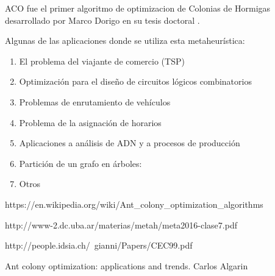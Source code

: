 ACO fue el primer algoritmo de optimizacion de Colonias de Hormigas desarrollado por Marco Dorigo en su tesis doctoral \cite{paperDorigo}. 

Algunas de las aplicaciones donde se utiliza esta metaheurística:
\begin{enumerate}
\item El problema del viajante de comercio (TSP)
\item Optimización para el diseño de circuitos lógicos combinatorios
\item Problemas de enrutamiento de vehículos
\item Problema de la asignación de horarios
\item Aplicaciones a análisis de ADN y a procesos de producción
\item Partición de un grafo en árboles:
\item Otros
\end{enumerate}



\begin{thebibliography}{9}
https://en.wikipedia.org/wiki/Ant\_colony\_optimization\_algorithms

http://www-2.dc.uba.ar/materias/metah/meta2016-clase7.pdf

 
http://people.idsia.ch/~gianni/Papers/CEC99.pdf

Ant colony optimization: applications and trends. Carlos Algarin

\end{thebibliography}